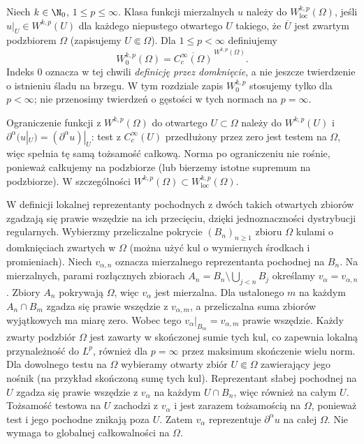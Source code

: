 \begin{definicja}
\label{def:pde9-local-zero}
Niech $k\in\N_0$, $1\le p\le\infty$.
Klasa funkcji mierzalnych $u$ należy do
$W^{k,p}_{\mathrm{loc}}(\Omega)$, jeśli
$u|_U\in W^{k,p}(U)$ dla każdego niepustego otwartego $U$
takiego, że $\overline U$ jest zwartym podzbiorem $\Omega$
(zapisujemy $U\Subset\Omega$).
Dla $1\le p<\infty$ definiujemy
\[
 W^{k,p}_0(\Omega)=\overline{C_c^\infty(\Omega)}^{\,W^{k,p}(\Omega)}.
\]
Indeks $0$ oznacza w tej chwili \emph{definicję przez domknięcie},
a nie jeszcze twierdzenie o istnieniu śladu na brzegu.
W tym rozdziale zapis $W^{k,p}_0$ stosujemy tylko dla $p<\infty$;
nie przenosimy twierdzeń o gęstości w tych normach na $p=\infty$.
\end{definicja}

Ograniczenie funkcji z $W^{k,p}(\Omega)$ do otwartego
$U\subset\Omega$ należy do $W^{k,p}(U)$ i
$\partial^\alpha(u|_U)=(\partial^\alpha u)|_U$:
test z $C_c^\infty(U)$ przedłużony przez zero jest testem
na $\Omega$, więc spełnia tę samą tożsamość całkową.
Norma po ograniczeniu nie rośnie, ponieważ całkujemy
na podzbiorze (lub bierzemy istotne supremum na podzbiorze).
W szczególności $W^{k,p}(\Omega)\subset W^{k,p}_{\mathrm{loc}}(\Omega)$.

W definicji lokalnej reprezentanty pochodnych z dwóch
takich otwartych zbiorów zgadzają się prawie wszędzie
na ich przecięciu, dzięki jednoznaczności dystrybucji regularnych.
Wybierzmy przeliczalne pokrycie $(B_n)_{n\ge1}$
zbioru $\Omega$ kulami o domknięciach zwartych w $\Omega$
(można użyć kul o wymiernych środkach i promieniach).
Niech $v_{\alpha,n}$ oznacza mierzalnego reprezentanta
pochodnej na $B_n$. Na mierzalnych, parami rozłącznych
zbiorach $A_n=B_n\setminus\bigcup_{j<n}B_j$
określamy $v_\alpha=v_{\alpha,n}$.
Zbiory $A_n$ pokrywają $\Omega$, więc $v_\alpha$ jest
mierzalna. Dla ustalonego $m$ na każdym $A_n\cap B_m$
zgadza się prawie wszędzie z $v_{\alpha,m}$, a
przeliczalna suma zbiorów wyjątkowych ma miarę zero.
Wobec tego $v_\alpha|_{B_m}=v_{\alpha,m}$ prawie wszędzie.
Każdy zwarty podzbiór $\Omega$ jest zawarty w skończonej
sumie tych kul, co zapewnia lokalną przynależność do $L^p$,
również dla $p=\infty$ przez maksimum skończenie wielu norm.
Dla dowolnego testu na $\Omega$ wybieramy otwarty zbiór
$U\Subset\Omega$ zawierający jego nośnik (na przykład
skończoną sumę tych kul). Reprezentant słabej pochodnej
na $U$ zgadza się prawie wszędzie z $v_\alpha$
na każdym $U\cap B_n$, więc również na całym $U$.
Tożsamość testowa na $U$ zachodzi z $v_\alpha$
i jest zarazem tożsamością na $\Omega$, ponieważ
test i jego pochodne znikają poza $U$. Zatem $v_\alpha$ reprezentuje
$\partial^\alpha u$ na całej $\Omega$.
Nie wymaga to globalnej całkowalności na $\Omega$.

